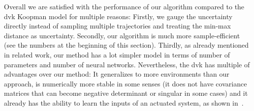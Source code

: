 		Overall we are satisfied with the performance of our algorithm compared to the \ac{dvk} Koopman model for multiple reasons: Firstly, we gauge the uncertainty directly instead of sampling multiple trajectories and treating the min-max distance as uncertainty. Secondly, our algorithm is much more sample-efficient (see the numbers at the beginning of this section). Thirdly, as already mentioned in related work, our method has a lot simpler model in terms of number of parameters and number of neural networks. Nevertheless, the \ac{dvk} has multiple of advantages over our method: It generalizes to more environments than our approach, is numerically more stable in some senses (\eg it does not have covariance matrices that can become negative determinant or singular in some cases) and it already has the ability to learn the inputs of an actuated system, as shown in~\cite{mortonDeepVariationalKoopman2019a}.


